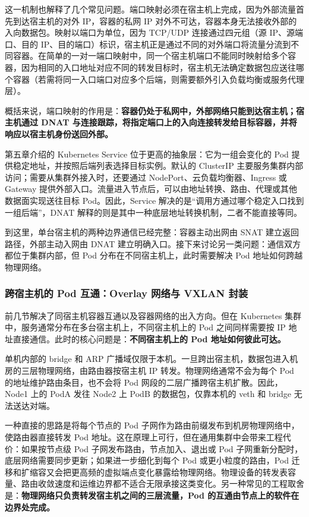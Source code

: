 这一机制也解释了几个常见问题。端口映射必须在宿主机上完成，因为外部流量首先到达宿主机的对外 IP，容器的私网 IP 对外不可达，容器本身无法接收外部的入向数据包。映射以端口为单位，因为 TCP/UDP 连接通过四元组（源 IP、源端口、目的 IP、目的端口）标识，宿主机正是通过不同的对外端口将流量分流到不同容器。在简单的一对一端口映射中，同一个宿主机端口不能同时映射给多个容器，因为相同的入口地址对应不同的转发目标时，宿主机无法确定数据包应送往哪个容器（若需将同一入口端口对应多个后端，则需要额外引入负载均衡或服务代理层）。

概括来说，端口映射的作用是：\textbf{容器仍处于私网中，外部网络只能到达宿主机；宿主机通过 DNAT 与连接跟踪，将指定端口上的入向连接转发给目标容器，并将响应以宿主机身份送回外部。}

第五章介绍的 Kubernetes Service 位于更高的抽象层：它为一组会变化的 Pod 提供稳定地址，并按照后端列表选择目标实例。默认的 ClusterIP 主要服务集群内部访问；需要从集群外接入时，还要通过 NodePort、云负载均衡器、Ingress 或 Gateway 提供外部入口。流量进入节点后，可以由地址转换、路由、代理或其他数据面实现送往目标 Pod。因此，Service 解决的是“调用方通过哪个稳定入口找到一组后端”，DNAT 解释的则是其中一种底层地址转换机制，二者不能直接等同。

到这里，单台宿主机的两种边界通信已经完整：容器主动出网由 SNAT 建立返回路径，外部主动入网由 DNAT 建立明确入口。接下来讨论另一类问题：通信双方都位于集群内部，但 Pod 分布在不同宿主机上，此时需要解决 Pod 地址如何跨越物理网络。

\subsubsection{跨宿主机的 Pod 互通：Overlay 网络与 VXLAN 封装}

前几节解决了同宿主机容器互通以及容器网络的出入方向。但在 Kubernetes 集群中，服务通常分布在多台宿主机上，不同宿主机上的 Pod 之间同样需要按 IP 地址直接通信。此时的核心问题是：\textbf{不同宿主机上的 Pod 地址如何彼此可达。}

单机内部的 bridge 和 ARP 广播域仅限于本机。一旦跨出宿主机，数据包进入机房的三层物理网络，由路由器按宿主机 IP 转发。物理网络通常不会为每个 Pod 的地址维护路由条目，也不会将 Pod 网段的二层广播跨宿主机扩散。因此，Node1 上的 PodA 发往 Node2 上 PodB 的数据包，仅靠本机的 veth 和 bridge 无法送达对端。

一种直接的思路是将每个节点的 Pod 子网作为路由前缀发布到机房物理网络中，使路由器直接转发 Pod 地址。这在原理上可行，但在通用集群中会带来工程代价：如果按节点级 Pod 子网发布路由，节点加入、退出或 Pod 子网重新分配时，底层网络需要同步更新；如果进一步细化到每个 Pod 或更小粒度的路由，Pod 迁移和扩缩容又会把更高频的虚拟端点变化暴露给物理网络。物理设备的转发表容量、路由收敛速度和运维边界都不适合无限承接这类变化。另一种常见的工程取舍是：\textbf{物理网络只负责转发宿主机之间的三层流量，Pod 的互通由节点上的软件在边界处完成。}

